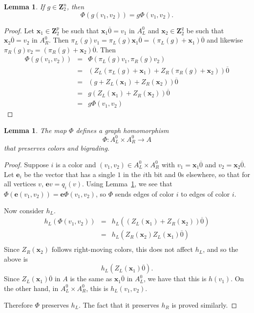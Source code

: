 \documentclass[12pt,twoside,singlespace]{article}
\numberwithin{equation}{section}
\newtheorem{lem}[equation]{Lemma}
\theoremstyle{definition}
\newcommand{\ZZ}{\mathbf{Z}}
\renewcommand{\vec}[1]{\mathbf{#1}}
\begin{document}
\begin{lem}
\label{lem:gphi}
If $g\in \ZZ_2^n$, then
\[\Phi(g(v_1,v_2))=g\Phi(v_1,v_2).\]
\end{lem}
\begin{proof}
Let $\vec{x}_1\in \ZZ_2^p$ be such that $\vec{x}_1\overline{0}=v_1$ in $A_L^0$ and $\vec{x}_2\in \ZZ_2^q$ be such that $\vec{x}_2\overline{0}=v_2$ in $A_R^0$.  Then $\pi_L(g)v_1 = \pi_L(g)\vec{x}_1\overline{0}=(\pi_L(g)+\vec{x}_1)\overline{0}$ and likewise $\pi_R(g)v_2=(\pi_R(g)+\vec{x}_2)\overline{0}$.  Then
\begin{eqnarray*}
\Phi(g(v_1,v_2))&=&\Phi(\pi_L(g)v_1,\pi_R(g)v_2)\\
&=&(Z_L(\pi_L(g)+\vec{x}_1)+Z_R(\pi_R(g)+\vec{x}_2))\overline{0}\\
&=&(g+Z_L(\vec{x}_1)+Z_R(\vec{x}_2))\overline{0}\\
&=&g(Z_L(\vec{x}_1)+Z_R(\vec{x}_2))\overline{0}\\
&=&g\Phi(v_1,v_2)
\end{eqnarray*}
\end{proof}


\begin{lem}
\label{lem:mainhomo}
The map $\Phi$ defines a graph homomorphism
\[\Phi:A_L^0\times A_R^0 \to A\]
that preserves colors and bigrading.
\end{lem}
\begin{proof}
Suppose $i$ is a color and $(v_1,v_2)\in A_L^0\times A_R^0$ with $v_1=\vec{x}_1\overline{0}$ and $v_2=\vec{x}_2\overline{0}$.  Let $\vec{e}_i$ be the vector that has a single $1$ in the $i$th bit and $0$s elsewhere, so that for all vertices $v$, $\vec{e}v=q_i(v)$.  Using Lemma~\ref{lem:gphi}, we see that $\Phi(\vec{e}(v_1,v_2))=\vec{e}\Phi(v_1,v_2)$, so $\Phi$ sends edges of color $i$ to edges of color $i$.

Now consider $h_L$.
\begin{eqnarray*}
h_L(\Phi(v_1,v_2)) &=& h_L((Z_L(\vec{x}_1)+Z_R(\vec{x}_2))\overline{0})\\
 &=& h_L(Z_R(\vec{x}_2)Z_L(\vec{x}_1)\overline{0})\\
\end{eqnarray*}
Since $Z_R(\vec{x}_2)$ follows right-moving colors, this does not affect $h_L$, and so the above is
\[h_L(Z_L(\vec{x}_1)\overline{0}).\]
Since $Z_L(\vec{x}_1)\overline{0}$ in $A$ is the same as $\vec{x}_1\overline{0}$ in $A_L^0$, we have that this is $h(v_1)$.  On the other hand, in $A_L^0\times A_R^0$, this is $h_L(v_1,v_2)$.

Therefore $\Phi$ preserves $h_L$.  The fact that it preserves $h_R$ is proved similarly.
\end{proof}
\end{document}
